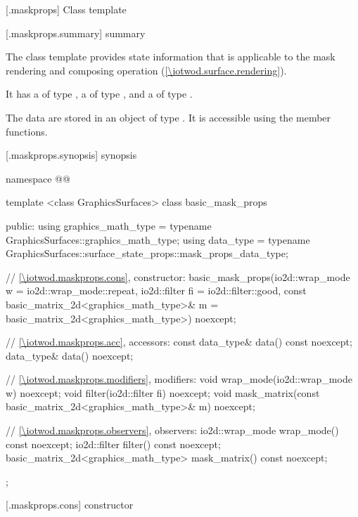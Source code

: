 
 [\iotwod.maskprops] {Class template }

 [\iotwod.maskprops.summary] { summary}

\pnum
The  class template provides state information that is applicable to the mask rendering and composing operation (\ref{\iotwod.surface.rendering}).

\pnum
It has a  of type , a  of type , and a  of type .

\pnum
The data are stored in an object of type . It is accessible using the  member functions.

 [\iotwod.maskprops.synopsis] { synopsis}

\begin{codeblock}
namespace @\fullnamespace{}@ {
  template <class GraphicsSurfaces>
  class basic_mask_props {
    public:
    using graphics_math_type = typename GraphicsSurfaces::graphics_math_type;
    using data_type =
      typename GraphicsSurfaces::surface_state_props::mask_props_data_type;

    // \ref{\iotwod.maskprops.cons}, constructor:
    basic_mask_props(io2d::wrap_mode w = io2d::wrap_mode::repeat,
      io2d::filter fi = io2d::filter::good,
      const basic_matrix_2d<graphics_math_type>& m = basic_matrix_2d<graphics_math_type>{})
      noexcept;

    // \ref{\iotwod.maskprops.acc}, accessors:
    const data_type& data() const noexcept;
    data_type& data() noexcept;

    // \ref{\iotwod.maskprops.modifiers}, modifiers:
    void wrap_mode(io2d::wrap_mode w) noexcept;
    void filter(io2d::filter fi) noexcept;
    void mask_matrix(const basic_matrix_2d<graphics_math_type>& m) noexcept;

    // \ref{\iotwod.maskprops.observers}, observers:
    io2d::wrap_mode wrap_mode() const noexcept;
    io2d::filter filter() const noexcept;
    basic_matrix_2d<graphics_math_type> mask_matrix() const noexcept;
  };
}
\end{codeblock}

 [\iotwod.maskprops.cons] { constructor}

